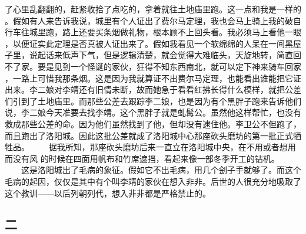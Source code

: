 了心里乱翻翻的，赶紧收拾了点吃的，拿着就往土地庙里跑。这一点和我是一样的 。假如有人来告诉我说，城里有个人证出了费尔马定理，我也会马上骑上我的破自 行车往城里跑，路上还要买条烟做礼物，根本顾不上回头看。我必须马上看他一眼 ，以便证实此定理是否真被人证出来了。假如我看见一个软绵绵的人呆在一间黑屋 子里，说起话来低声下气，但是逻辑清楚，就会觉得大难临头，天旋地转，简直回 不了家。要是见到一个怪诞的家伙，狂得不知东西南北，就可以定下神来骑车回家 ，一路上可惜我那条烟。这是因为我就算证不出费尔马定理，也能看出谁能把它证 出来。李二娘对李靖还有旧情未断，故而她急于看看红拂长得什么模样，就把公差 们引到了土地庙里。而那些公差去跟踪李二娘，也是因为有个黑胖子跑来告诉他们 说，李二娘今天准要去找李靖。这个黑胖子就是虬髯公。虽然他这样帮忙，也没有 救成那些公差的命。因为他们虽然找到了他，但却没有逮住他。李卫公不但跑了， 而且跑出了洛阳城。因此这批公差就成了洛阳城中心那座砍头磨坊的第一批正式牺 牲品。 　　据我所知，那座砍头磨坊后来一直立在洛阳城中央，在不用或者想用而没有风 的时候在四面用帆布和竹席遮挡，看起来像一部冬季开工的钻机。 　　这是洛阳城出了毛病的象征。假如它不出毛病，用几个刽子手就够了。而这个 毛病的起因，仅仅是其中有个叫李靖的家伙在想入非非。后世的人很充分地吸取了 这个教训——以后列朝列代，想入非非都是严格禁止的。 
 
 
\subsection{二} 
 
